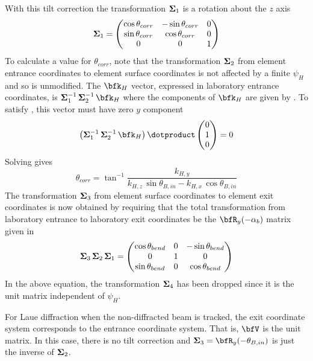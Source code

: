 With this tilt correction the transformation ${\bf \Sigma}_1$ is a
rotation about the $z$ axis
\begin{equation}
  {\bf \Sigma}_1 = 
  \begin{pmatrix}
    \cos\theta_{corr} & -\sin\theta_{corr} & 0 \\
    \sin\theta_{corr} &  \cos\theta_{corr} & 0 \\
    0                 &  0                 & 1                
  \end{pmatrix}
\end{equation}
To calculate a value for $\theta_{corr}$, note that
the transformation ${\bf \Sigma}_2$ from element entrance coordinates to element surface
coordinates is not affected by a finite $\psi_H$ and so 
is unmodified. The $\bfk_H$ vector, expressed in laboratory entrance
coordinates, is $\Bf\Sigma_1^{-1} \, \Bf\Sigma_2^{-1} \, \bfk_H$ where the
components of $\bfk_H$ are given by . To
satisfy , this vector must have zero $y$ component
\begin{equation}
  \left( \Bf\Sigma_1^{-1} \, \Bf\Sigma_2^{-1} \, \bfk_H \right) \dotproduct
  \begin{pmatrix} 0 \\ 1 \\ 0 \end{pmatrix}
  = 0
\end{equation}
Solving gives
\begin{equation}
  \theta_{corr} = \tan^{-1} 
  \frac{k_{H,y}}{k_{H,z} \, \sin\theta_{B,in} - k_{H,x} \, \cos\theta_{B,in}}
\end{equation}
The transformation ${\bf \Sigma}_3$ from element surface coordinates to
element exit coordinates is now obtained by requiring that the total
transformation from laboratory entrance to laboratory exit coordinates
be the $\bfR_{y}(-\alpha_b)$ matrix given in 
\begin{equation}
  {\bf \Sigma}_3 \, {\bf \Sigma}_2 \, {\bf \Sigma}_1 = 
  \begin{pmatrix}
    \cos\theta_{bend} & 0 & -\sin\theta_{bend} \\
    0          & 1 & 0           \\
    \sin\theta_{bend} & 0 & \cos\theta_{bend}
  \end{pmatrix}
\end{equation}
In the above equation, the transformation ${\bf \Sigma}_4$ has been
dropped since it is the unit matrix independent of $\psi_H$.

For Laue diffraction when the non-diffracted beam is tracked, the exit
coordinate system corresponds to the entrance coordinate system. That
is, $\bfV$ is the unit matrix. In this case, there is no tilt
correction and $\Bf\Sigma_3 = \bfR_y(-\theta_{B,in})$ is just the
inverse of ${\bf \Sigma}_2$.

